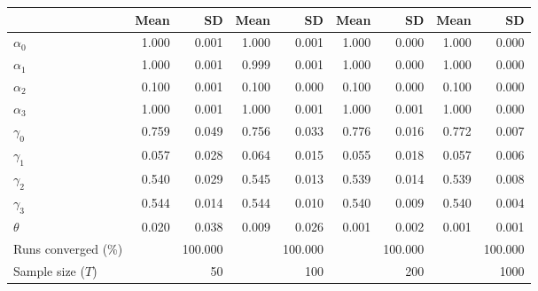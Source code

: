
\begin{tabular}[t]{lrrrrrrrr}
\toprule
  & Mean & SD & Mean  & SD  & Mean   & SD   & Mean    & SD   \\
\midrule
$\alpha_{0}$ & 1.000 & 0.001 & 1.000 & 0.001 & 1.000 & 0.000 & 1.000 & 0.000\\
$\alpha_{1}$ & 1.000 & 0.001 & 0.999 & 0.001 & 1.000 & 0.000 & 1.000 & 0.000\\
$\alpha_{2}$ & 0.100 & 0.001 & 0.100 & 0.000 & 0.100 & 0.000 & 0.100 & 0.000\\
$\alpha_{3}$ & 1.000 & 0.001 & 1.000 & 0.001 & 1.000 & 0.001 & 1.000 & 0.000\\
$\gamma_{0}$ & 0.759 & 0.049 & 0.756 & 0.033 & 0.776 & 0.016 & 0.772 & 0.007\\
$\gamma_{1}$ & 0.057 & 0.028 & 0.064 & 0.015 & 0.055 & 0.018 & 0.057 & 0.006\\
$\gamma_{2}$ & 0.540 & 0.029 & 0.545 & 0.013 & 0.539 & 0.014 & 0.539 & 0.008\\
$\gamma_{3}$ & 0.544 & 0.014 & 0.544 & 0.010 & 0.540 & 0.009 & 0.540 & 0.004\\
$\theta$ & 0.020 & 0.038 & 0.009 & 0.026 & 0.001 & 0.002 & 0.001 & 0.001\\
Runs converged (\%) &  & 100.000 &  & 100.000 &  & 100.000 &  & 100.000\\
Sample size ($T$) &  & 50 &  & 100 &  & 200 &  & 1000\\
\bottomrule
\end{tabular}
